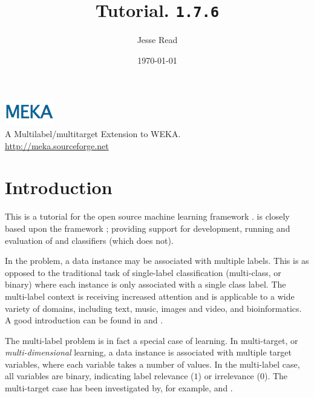 \documentclass[11pt]{article}
\newcommand{\MEKA}{Meka}
\newcommand{\WEKA}{Weka}
\def\version{{\tt 1.7.6}}
\begin{document}
\title{Tutorial. \framework{\MEKA} \version }

\author{Jesse Read}

\date{\mydate\today}

\maketitle

\begin{center}
	\includegraphics{MEKA.png}\\
		A Multilabel/multitarget Extension to WEKA.\\
		\url{http://meka.sourceforge.net}
\end{center}

\tableofcontents

\thispagestyle{empty}
\pagebreak

\section{Introduction}

This is a tutorial for the open source machine learning framework \framework{\MEKA}. \framework{\MEKA} is closely based upon the \framework{\WEKA} framework \cite{WEKA}; providing support for development, running and evaluation of  and  classifiers (which  does not).

In the  problem, a data instance may be associated with multiple labels. This is as opposed to the traditional task of single-label classification (\ie multi-class, or binary) where each instance is only associated with a single class label. The multi-label context is receiving increased attention and is applicable to a wide variety of domains, including text, music, images and video, and bioinformatics. A good introduction can be found in \cite{MMD} and \cite{Thesis}.

The multi-label problem is in fact a special case of  learning. In multi-target, or \textit{multi-dimensional} learning, a data instance is associated with multiple target variables, where each variable takes a number of values. In the multi-label case, all variables are binary, indicating label relevance ($1$) or irrelevance ($0$). The multi-target case has been investigated by, for example, \cite{UPM} and \cite{MT}.  
\end{document}
